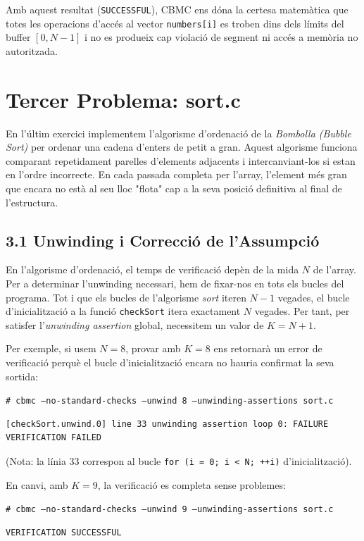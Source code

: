 \documentclass[12pt,a4paper]{article}
\begin{document}
Amb aquest resultat (\texttt{SUCCESSFUL}), CBMC ens dóna la certesa matemàtica que totes les operacions d'accés al vector \texttt{numbers[i]} es troben dins dels límits del buffer $[0, N-1]$ i no es produeix cap violació de segment ni accés a memòria no autoritzada.


\section{Tercer Problema: sort.c}

En l'últim exercici implementem l'algorisme d'ordenació de la \textit{Bombolla (Bubble Sort)} per ordenar una cadena d'enters de petit a gran. Aquest algorisme funciona comparant repetidament parelles d'elements adjacents i intercanviant-los si estan en l'ordre incorrecte. En cada passada completa per l'array, l'element més gran que encara no està al seu lloc "flota" cap a la seva posició definitiva al final de l'estructura.

\subsection{3.1 Unwinding i Correcció de l'Assumpció}

En l'algorisme d'ordenació, el temps de verificació depèn de la mida $N$ de l'array. Per a determinar l'unwinding necessari, hem de fixar-nos en tots els bucles del programa. Tot i que els bucles de l'algorisme \textit{sort} iteren $N-1$ vegades, el bucle d'inicialització a la funció \texttt{checkSort} itera exactament $N$ vegades. Per tant, per satisfer l'\textit{unwinding assertion} global, necessitem un valor de $K = N+1$.

Per exemple, si usem $N=8$, provar amb $K=8$ ens retornarà un error de verificació perquè el bucle d'inicialització encara no hauria confirmat la seva sortida:

\begin{tcolorbox}[colback=black!85, coltext=white]
\texttt{\# cbmc --no-standard-checks --unwind 8 --unwinding-assertions sort.c}
\end{tcolorbox}
\begin{verbatim}
[checkSort.unwind.0] line 33 unwinding assertion loop 0: FAILURE
VERIFICATION FAILED
\end{verbatim}
(Nota: la línia 33 correspon al bucle \texttt{for (i = 0; i < N; ++i)} d'inicialització).

En canvi, amb $K=9$, la verificació es completa sense problemes:
\begin{tcolorbox}[colback=black!85, coltext=white]
\texttt{\# cbmc --no-standard-checks --unwind 9 --unwinding-assertions sort.c}
\end{tcolorbox}
\begin{verbatim}
VERIFICATION SUCCESSFUL
\end{verbatim}
\end{document}
